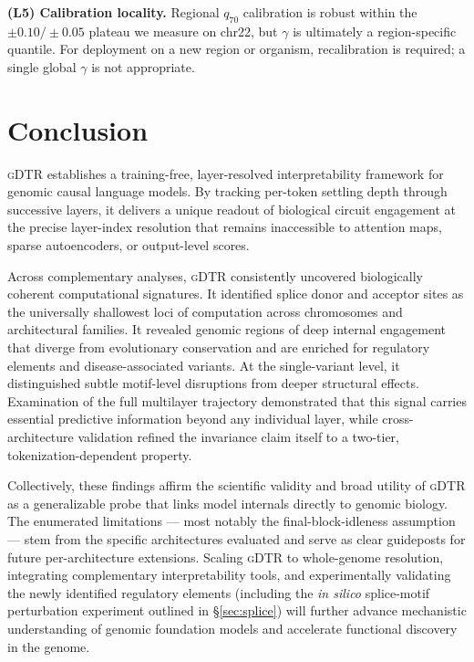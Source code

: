 \documentclass{article}
\theoremstyle{plain}
\theoremstyle{definition}
\theoremstyle{remark}
\newcommand{\gDTR}{\textsc{gDTR}}
\begin{document}
\textbf{(L5) Calibration locality.} Regional $q_{70}$ calibration is
robust within the $\pm 0.10/\pm 0.05$ plateau we measure on chr22, but
$\gamma$ is ultimately a region-specific quantile. For deployment on a
new region or organism, recalibration is required; a single global
$\gamma$ is not appropriate.

\section{Conclusion}
\label{sec:conclusion}

\gDTR{} establishes a training-free, layer-resolved interpretability
framework for genomic causal language models. By tracking per-token
settling depth through successive layers, it delivers a unique readout
of biological circuit engagement at the precise layer-index resolution
that remains inaccessible to attention maps, sparse autoencoders, or
output-level scores.

Across complementary analyses, \gDTR{} consistently uncovered
biologically coherent computational signatures. It identified splice
donor and acceptor sites as the universally shallowest loci of
computation across chromosomes and architectural families. It revealed
genomic regions of deep internal engagement that diverge from
evolutionary conservation and are enriched for regulatory elements and
disease-associated variants. At the single-variant level, it
distinguished subtle motif-level disruptions from deeper structural
effects. Examination of the full multilayer trajectory demonstrated
that this signal carries essential predictive information beyond any
individual layer, while cross-architecture validation refined the
invariance claim itself to a two-tier, tokenization-dependent property.

Collectively, these findings affirm the scientific validity and broad
utility of \gDTR{} as a generalizable probe that links model internals
directly to genomic biology. The enumerated limitations --- most
notably the final-block-idleness assumption --- stem from the specific
architectures evaluated and serve as clear guideposts for future
per-architecture extensions. Scaling \gDTR{} to whole-genome
resolution, integrating complementary interpretability tools, and
experimentally validating the newly identified regulatory elements
(including the \emph{in silico} splice-motif perturbation experiment
outlined in \S\ref{sec:splice}) will further advance mechanistic
understanding of genomic foundation models and accelerate functional
discovery in the genome.
\end{document}
